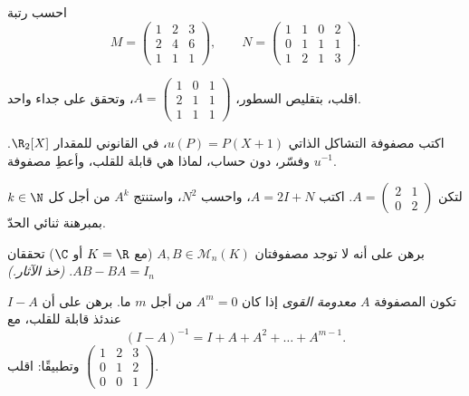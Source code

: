 \begin{exercise}[$\star$]\label{exo:b1:matrices:2}
احسب رتبة
\[
M = \begin{pmatrix}
1 & 2 & 3\\
2 & 4 & 6\\
1 & 1 & 1
\end{pmatrix},
\qquad
N = \begin{pmatrix}
1 & 1 & 0 & 2\\
0 & 1 & 1 & 1\\
1 & 2 & 1 & 3
\end{pmatrix}.
\]
\end{exercise}

\begin{exercise}[$\star$]\label{exo:b1:matrices:3}
اقلب، بتقليص السطور، $A = \begin{pmatrix} 1 & 0 & 1\\ 2 & 1 &
1\\ 1 & 1 & 1 \end{pmatrix}$، وتحقق على جداء واحد.
\end{exercise}

\begin{exercise}[$\star$]\label{exo:b1:matrices:4}
اكتب مصفوفة التشاكل الذاتي $u(P) = P(X + 1)$، في  القانوني
للمقدار $\R_2[X]$. وفسّر، دون حساب، لماذا
هي قابلة للقلب، وأعطِ مصفوفة $u^{-1}$.
\end{exercise}

\begin{exercise}[$\star\star$]\label{exo:b1:matrices:5}
لتكن $A = \begin{pmatrix} 2 & 1 \\ 0 & 2\end{pmatrix}$. اكتب $A =
2I + N$، واحسب $N^2$، واستنتج $A^k$ من أجل كل $k \in \N$ بمبرهنة
ثنائي الحدّ.
\end{exercise}

\begin{exercise}[$\star\star$]\label{exo:b1:matrices:6}
برهن على أنه لا توجد مصفوفتان $A, B \in \mathcal{M}_n(K)$ (مع
$K = \R$ أو $\C$) تحققان $AB - BA = I_n$. \emph{(خذ الآثار.)}
\end{exercise}

\begin{exercise}[$\star\star$]\label{exo:b1:matrices:7}
تكون المصفوفة $A$ \emph{معدومة القوى} إذا كان $A^m = 0$ من أجل $m$ ما. برهن
على أن $I - A$ عندئذ قابلة للقلب، مع
\[
(I - A)^{-1} = I + A + A^2 + \dots + A^{m-1} .
\]
وتطبيقًا: اقلب $\begin{pmatrix} 1 & 2 & 3\\ 0 & 1 & 2\\ 0 & 0 &
1\end{pmatrix}$.
\end{exercise}

